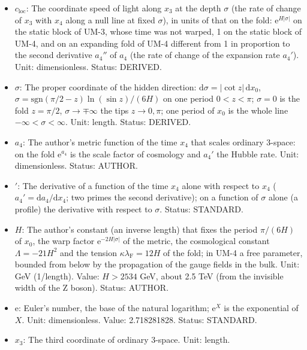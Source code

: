 \documentclass[
  10pt,
]{article}
\providecommand{\tightlist}{%
  \setlength{\itemsep}{0pt}\setlength{\parskip}{0pt}}
\begin{document}
\begin{itemize}
\tightlist
\item
  \(c_{\mathrm{loc}}\): The coordinate speed of light along \(x_3\) at
  the depth \(\sigma\) (the rate of change of \(x_3\) with \(x_4\) along
  a null line at fixed \(\sigma\)), in units of that on the fold:
  \(\mathrm{e}^{H\lvert\sigma\rvert}\) on the static block of UM-3,
  whose time was not warped, 1 on the static block of UM-4, and on an
  expanding fold of UM-4 different from 1 in proportion to the second
  derivative \(a_4''\) of \(a_4\) (the rate of change of the expansion
  rate \(a_4'\)). Unit: dimensionless. Status: DERIVED.
\item
  \(\sigma\): The proper coordinate of the hidden direction:
  \(\mathrm{d}\sigma = \lvert\cot z\rvert\,\mathrm{d}x_0\),
  \(\sigma = \mathrm{sgn}(\pi/2 - z)\ln(\sin z)/(6H)\) on one period
  \(0 < z < \pi\); \(\sigma = 0\) is the fold \(z = \pi/2\),
  \(\sigma \to \mp\infty\) the tips \(z \to 0, \pi\); one period of
  \(x_0\) is the whole line \(-\infty < \sigma < \infty\). Unit: length.
  Status: DERIVED.
\item
  \(a_4\): The author's metric function of the time \(x_4\) that scales
  ordinary 3-space: on the fold \(\mathrm{e}^{a_4}\) is the scale factor
  of cosmology and \(a_4'\) the Hubble rate. Unit: dimensionless.
  Status: AUTHOR.
\item
  \({}'\): The derivative of a function of the time \(x_4\) alone with
  respect to \(x_4\) (\(a_4' = \mathrm{d}a_4/\mathrm{d}x_4\); two primes
  the second derivative); on a function of \(\sigma\) alone (a profile)
  the derivative with respect to \(\sigma\). Status: STANDARD.
\item
  \(H\): The author's constant (an inverse length) that fixes the period
  \(\pi/(6H)\) of \(x_0\), the warp factor
  \(\mathrm{e}^{-2H\lvert\sigma\rvert}\) of the metric, the cosmological
  constant \(\Lambda = -21H^2\) and the tension
  \(\kappa\lambda_{\mathrm{F}} = 12H\) of the fold; in UM-4 a free
  parameter, bounded from below by the propagation of the gauge fields
  in the bulk. Unit: GeV (1/length). Value: \(H > 2534\) GeV, about 2.5
  TeV (from the invisible width of the Z boson). Status: AUTHOR.
\item
  \(\mathrm{e}\): Euler's number, the base of the natural logarithm;
  \(\mathrm{e}^{X}\) is the exponential of \(X\). Unit: dimensionless.
  Value: 2.718281828. Status: STANDARD.
\item
  \(x_3\): The third coordinate of ordinary 3-space. Unit: length.

\end{itemize}
\end{document}
